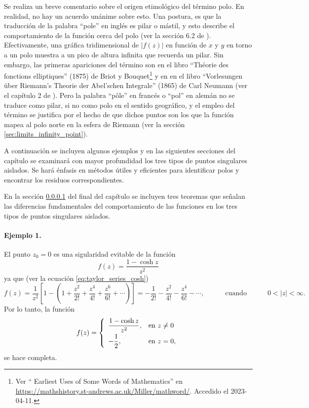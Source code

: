 \documentclass[a4paper]{report}
\begin{document}
Se realiza un breve comentario sobre el origen etimológico del término polo. En realidad, no hay un acuerdo unánime sobre esto. Una postura, es que la traducción de la palabra ``pole'' en inglés es pilar o mástil, y esto describe el comportamiento de la función cerca del polo (ver la sección 6.2 de \cite{wunsch205complex}). Efectivamente, una gráfica tridimensional de \(|f(z)|\) en función de \(x\) y \(y\) en torno a un polo muestra a un pico de altura infinita que recuerda un pilar. Sin embargo, las primeras apariciones del término son en el libro ``Théorie des fonctions elliptiques'' (1875) de Briot y Bouquet\footnote{Ver ``
Earliest Uses of Some Words of Mathematics'' en \url{https://mathshistory.st-andrews.ac.uk/Miller/mathword/}. Accedido el 2023-04-11.} y en en el libro ``Vorlesungen über Riemann’s Theorie der Abel’schen Integrale'' (1865) de Carl Neumann (ver el capítulo 2 de \cite{kolmogorov1996mathematics}). Pero la palabra ``pôle'' en francés o ``pol'' en alemán no se traduce como pilar, si no como polo en el sentido geográfico, y el empleo del término se justifica por el hecho de que dichos puntos son los que la función mapea al polo norte en la esfera de Riemann (ver la sección \ref{sec:limits_infinity_point}).

A continuación se incluyen algunos ejemplos y en las siguientes secciones del capítulo se examinará con mayor profundidad los tres tipos de puntos singulares aislados. Se hará énfasis en métodos útiles y eficientes para identificar polos y encontrar los residuos correspondientes.

En la sección \ref{} del final del capítulo se incluyen tres teoremas que señalan las diferencias fundamentales del comportamiento de las funciones en los tres tipos de puntos singulares aislados. 

\paragraph{Ejemplo 1.} El punto \(z_0=0\) es una sigularidad evitable de la función 
\[
 f(z)=\frac{1-\cosh z}{z^2}
\]
ya que (ver la ecuación \ref{eq:taylor_series_cosh})
\[
 f(z)=\frac{1}{z^2}\left[1-\left(1+\frac{z^2}{2!}+\frac{z^4}{4!}+\frac{z^6}{6!}+\cdots\right)\right]
  =-\frac{1}{2!}-\frac{z^2}{4!}-\frac{z^4}{6!}-\cdots,
  \qquad\quad\textrm{cuando}\quad\qquad
  0<|z|<\infty.
\]
Por lo tanto, la función
\[
 f(z)=
 \left\{ 
 \begin{array}{ll}
  \dfrac{1-\cosh z}{z^2}, &\textrm{en }z\neq0\\[\medskipamount]
  -\dfrac{1}{2}, &\textrm{en }z=0, 
 \end{array}
 \right.
\]
se hace completa.
\end{document}
